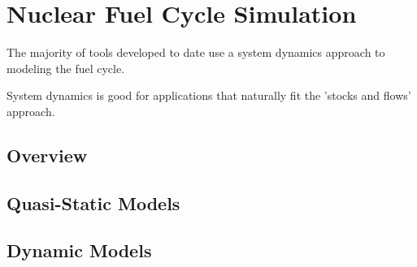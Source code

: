 
\section{Nuclear Fuel Cycle Simulation}\label{intro:fcs}

The majority of tools developed to date use a system dynamics approach to
modeling the fuel cycle.

System dynamics is good for applications that naturally fit the 'stocks and
flows' approach.

\subsection{Overview}

\subsection{Quasi-Static Models}

\subsection{Dynamic Models}
